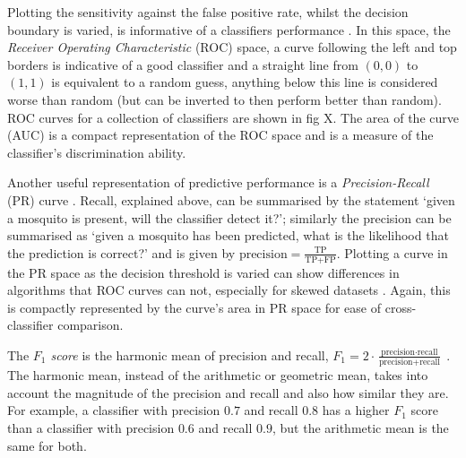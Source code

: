         \vspace{-1cm}
        Plotting the sensitivity against the false positive rate, whilst the decision boundary is varied, is informative of a classifiers performance \cite{Fawcett2005}. In this space, the \textit{Receiver Operating Characteristic} (ROC) space, a curve following the left and top borders is indicative of a good classifier and a straight line from $(0,0)$ to $(1,1)$ is equivalent to a random guess, anything below this line is considered worse than random (but can be inverted to then perform better than random). ROC curves for a collection of classifiers are shown in fig X. The area of the curve (AUC) is a compact representation of the ROC space and is a measure of the classifier's discrimination ability.
        
        Another useful representation of predictive performance is a \textit{Precision-Recall} (PR) curve \cite{Raghavan1989}. Recall, explained above, can be summarised by the statement `given a mosquito is present, will the classifier detect it?'; similarly the precision can be summarised as `given a mosquito has been predicted, what is the likelihood that the prediction is correct?' and is given by $\text{precision} = \frac{\text{TP}}{\text{TP+FP}}$. Plotting a curve in the PR space as the decision threshold is varied can show differences in algorithms that ROC curves can not, especially for skewed datasets \cite{Davis}. Again, this is compactly represented by the curve's area in PR space for ease of cross-classifier comparison.
        
        The \textit{$F_1$ score} is the harmonic mean of precision and recall, $F_1 = 2\cdot\frac{\text{precision}\cdot \text{recall}}{\text{precision}+\text{recall}}$ . The harmonic mean, instead of the arithmetic or geometric mean, takes into account the magnitude of the precision and recall and also how similar they are. For example, a classifier with precision $0.7$ and recall $0.8$ has a higher $F_1$ score than a classifier with precision $0.6$ and recall $0.9$, but the arithmetic mean is the same for both.
        
        
